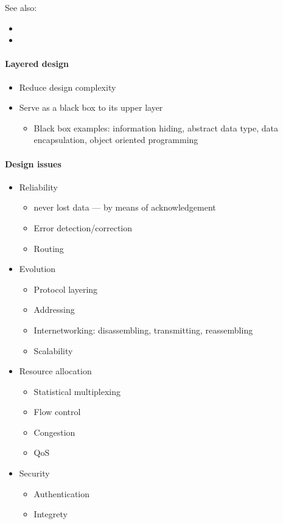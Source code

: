 See also:
\begin{itemize}
\item {}
\item {}
\end{itemize}

\paragraph{Layered design}

\begin{itemize}
\item Reduce design complexity
\item Serve as a black box to its upper layer
  \begin{itemize}
  \item Black box examples: information hiding, abstract data type, data encapsulation,
    object oriented programming
  \end{itemize}
\end{itemize}
  
\paragraph{Design issues}

\begin{itemize}
\item Reliability
  \begin{itemize}
  \item never lost data --- by means of acknowledgement
  \item Error detection/correction
  \item Routing
  \end{itemize}
\item Evolution
  \begin{itemize}
  \item Protocol layering
  \item Addressing
  \item Internetworking: disassembling, transmitting, reassembling
  \item Scalability
  \end{itemize}
\item Resource allocation
  \begin{itemize}
  \item Statistical multiplexing
  \item Flow control
  \item Congestion
  \item QoS
  \end{itemize}
\item Security
  \begin{itemize}
  \item Authentication
  \item Integrety
  \end{itemize}
\end{itemize}


